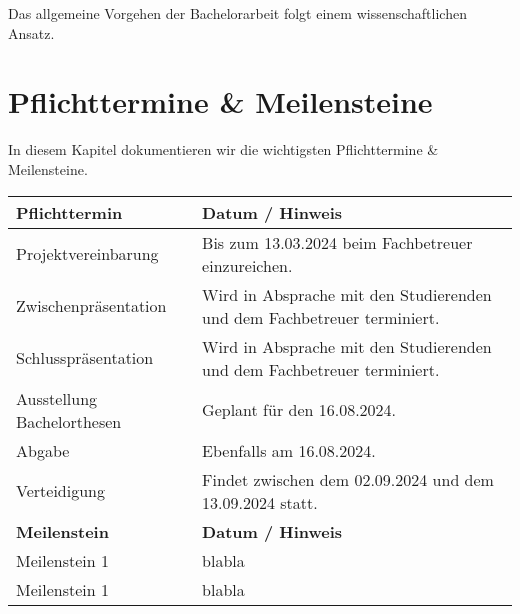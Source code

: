 Das allgemeine Vorgehen der Bachelorarbeit folgt einem wissenschaftlichen Ansatz.

\section{Pflichttermine \& Meilensteine}
In diesem Kapitel dokumentieren wir die wichtigsten Pflichttermine \& Meilensteine.

\begin{table}[ht]
    \centering
    \begin{tabular}{@{}lp{8cm}@{}}
        \toprule
        \textbf{Pflichttermin} & \textbf{Datum / Hinweis} \\
        \midrule
        Projektvereinbarung & Bis zum 13.03.2024 beim Fachbetreuer einzureichen. \\
        \midrule
        Zwischenpräsentation & Wird in Absprache mit den Studierenden und dem Fachbetreuer terminiert. \\
        \midrule
        Schlusspräsentation & Wird in Absprache mit den Studierenden und dem Fachbetreuer terminiert. \\
        \midrule
        Ausstellung Bachelorthesen & Geplant für den 16.08.2024. \\
        \midrule
        Abgabe & Ebenfalls am 16.08.2024. \\
        \midrule
        Verteidigung & Findet zwischen dem 02.09.2024 und dem 13.09.2024 statt. \\
        \toprule
        \textbf{Meilenstein} & \textbf{Datum / Hinweis} \\
        \midrule
        Meilenstein 1  & blabla \\
        \midrule
        Meilenstein 1  & blabla \\
        \bottomrule
    \end{tabular}
\end{table}
